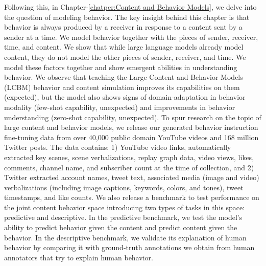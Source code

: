 Following this, in Chapter-\ref{chatper:Content and Behavior Models}, we delve into the question of modeling behavior. The key insight behind this chapter is that behavior is always produced by a receiver in response to a content sent by a sender at a time. We model behavior together with the pieces of sender, receiver, time, and content. We show that while large language models already model content, they do not model the other pieces of sender, receiver, and time. We model these factors together and show emergent abilities in understanding behavior. We observe that teaching the Large Content and Behavior Models (LCBM) behavior and content simulation improves its capabilities on them (expected), but the model also shows signs of domain-adaptation in behavior modality (few-shot capability, unexpected) and improvements in behavior understanding (zero-shot capability, unexpected). To spur research on the topic of large content and behavior models, we release our generated behavior instruction fine-tuning data from over 40,000 public domain YouTube videos and 168 million Twitter posts. The data contains: 1) YouTube video links, automatically extracted key scenes, scene verbalizations, replay graph data, video views, likes, comments, channel name, and subscriber count at the time of collection, and 2) Twitter extracted account names, tweet text, associated media (image and video) verbalizations (including image captions, keywords, colors, and tones), tweet timestamps, and like counts. We also release a benchmark to test performance on the joint content behavior space introducing two types of tasks in this space: predictive and descriptive. In the predictive benchmark, we test the model’s ability to predict behavior given the content and predict content given the behavior. In the descriptive benchmark, we validate its explanation of human behavior by comparing it with ground-truth annotations we obtain from human annotators that try to explain human behavior.




